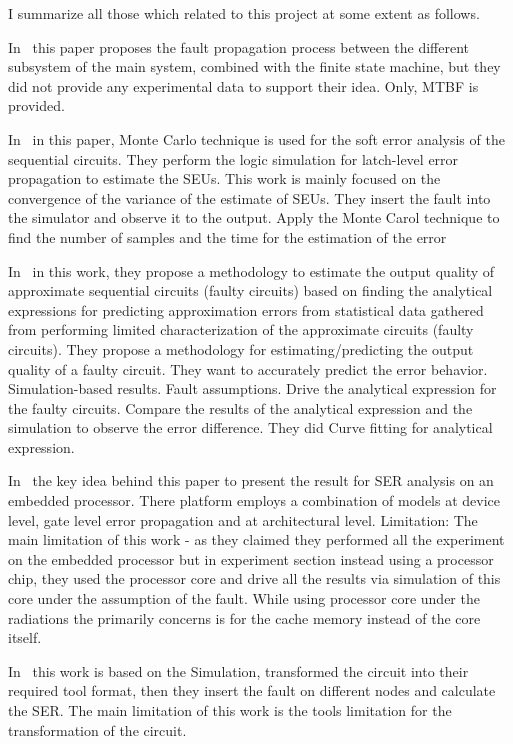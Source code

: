 I summarize all those which related to this project at some extent as follows.

In~\cite{chen2017fault} this paper proposes the fault propagation process between the different subsystem of the
main system, combined with the finite state machine, but they did not provide any experimental data to support their idea. Only, MTBF is provided.

In~\cite{li2016monte} in this paper, Monte Carlo technique is used for the soft error analysis of the sequential
circuits. They perform the logic simulation for latch-level error propagation to estimate the SEUs. This work is mainly focused on the convergence of the variance of the estimate of SEUs.
They insert the fault into the simulator and observe it to the output. Apply the Monte Carol technique
to find the number of samples and the time for the estimation of the error
  
  
In~\cite{kapare2016automated} in this work, they propose a methodology to estimate the output quality of approximate
sequential circuits (faulty circuits) based on finding the analytical expressions for predicting
approximation errors from statistical data gathered from performing limited characterization of the
approximate circuits (faulty circuits). They propose a methodology for estimating/predicting the output
quality of a faulty circuit. They want to accurately predict the error behavior. Simulation-based results. Fault assumptions. Drive the analytical expression for the faulty
circuits. Compare the results of the analytical expression and the simulation to observe the error
difference. They did Curve fitting for analytical expression. 

In~\cite{ebrahimi2015comprehensive}  the key idea behind this paper to present the result for SER analysis on an embedded
processor. There platform employs a combination of models at device level, gate level error
propagation and at architectural level.
Limitation: The main limitation of this work - as they claimed they performed all the experiment on
the embedded processor but in experiment section instead using a processor chip, they used the
processor core and drive all the results via simulation of this core under the assumption of the fault. While using processor core under the radiations the primarily concerns is for the cache memory instead
of the core itself.

In~\cite{ubar2014modeling} this work is based on the Simulation, transformed the circuit into their required tool format, then they
insert the fault on different nodes and calculate the SER. The main limitation of this work is the tools limitation for the transformation of the circuit.



